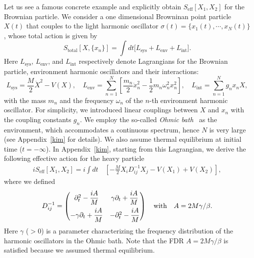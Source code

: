 \documentclass[a4paper,11pt]{article}
\begin{document}
Let us see a famous concrete example and explicitly 
obtain $S_{\mathrm{eff}}[X_1,X_2]$ for the Brownian particle. 
We consider a one dimensional Browninan point particle $X(t)$ 
that couples to the light harmonic oscillator 
$\sigma (t) =\{x_1 (t), \cdots, x_N(t)\}$, whose total action is given by
\begin{equation}
 S_{\mathrm{total}}[X,\{x_n\}] 
  = \int dt 
  \Big[ L_{\mathrm{sys}} + L_{\mathrm{env}} + L_{\mathrm{int}} \Big] .
  \label{eq:TotalL}
\end{equation}
Here $L_{\mathrm{sys}},\, L_{\mathrm{env}}$, and $L_{\mathrm{int}}$ 
respectively denote Lagrangians for the Brownian particle, 
environment harmonic oscillators and their interactions:
\begin{equation}
 L_{\mathrm{sys}} 
  = \dfrac{M}{2} \dot{X}^2 - V (X), 
  \quad
  L_{\mathrm{env}} 
  =  \displaystyle{\sum_{n=1}^N }
  \left[ \dfrac{m_n}{2} \dot{x}_n^2 - \dfrac{1}{2} m_n \omega_n^2 x_n^2 \right], 
  \quad
  L_{\mathrm{int}} 
  =  \displaystyle{\sum_{n=1}^N} g_nx_n X , 
  \label{eq:EachL}
\end{equation}
with the mass $m_n$ and the frequency $\omega_n$ of the $n$-th 
environment harmonic oscillator.
For simplicity, we introduced linear couplings between $X$ and $x_n$ with the coupling constants $g_n$.
We employ the so-called \textit{Ohmic bath}~\cite{kamenev2011field} as the environment, which accommodates a continuous spectrum, hence $N$ is very large (see Appendix~\ref{kim} for details).
We also assume thermal equilibrium at initial time ($t=-\infty$).
In Appendix~\ref{kim}, starting from this Lagrangian, we derive the following effective action 
for the heavy particle
\begin{align}
 iS_{\mathrm{eff}} [X_1,X_2] 
 = i\int dt\, 
 &\left[ - \frac{M}{2} X_{i} D^{-1}_{ij} X_{j} - V(X_1) + V(X_2) \right], 
 \label{eq:MSR3}
\end{align}
where we defined 
\begin{align}
 D^{-1}_{ij}
 = \begin{pmatrix}
    \partial_{t}^{2}-\dfrac{iA}{M} & \gamma\partial_{t} + \dfrac{iA}{M} 
    \vspace{5pt} \\
    - \gamma\partial_{t} + \dfrac{iA}{M} & - \partial_{t}^{2} - \dfrac{iA}{M}
   \end{pmatrix}
   \quad
   {\rm with}
   \quad
   A=2M\gamma/\beta
   .
  \label{D-1}
\end{align}
Here $\gamma$ ($>0$) is a parameter characterizing the frequency distribution of the harmonic oscillators in the Ohmic bath. Note that the FDR $A=2M\gamma/\beta$ is satisfied because we assumed thermal equilibrium.
\end{document}

